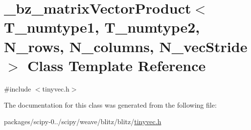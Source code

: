 \hypertarget{class__bz__matrixVectorProduct}{}\section{\+\_\+bz\+\_\+matrix\+Vector\+Product$<$ T\+\_\+numtype1, T\+\_\+numtype2, N\+\_\+rows, N\+\_\+columns, N\+\_\+vec\+Stride $>$ Class Template Reference}
\label{class__bz__matrixVectorProduct}


{\ttfamily \#include $<$tinyvec.\+h$>$}



The documentation for this class was generated from the following file\+:\begin{DoxyCompactItemize}
\item 
packages/scipy-\/0../scipy/weave/blitz/blitz/\hyperlink{tinyvec_8h}{tinyvec.\+h}\end{DoxyCompactItemize}
